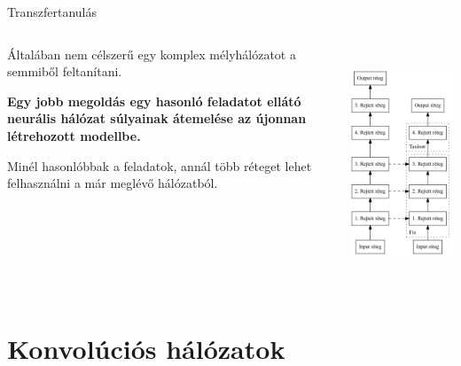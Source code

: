 \documentclass[english, aspectratio=169]{beamer}
\makeatletter
\let\origtableofcontents=\tableofcontents
\def\tableofcontents{\@ifnextchar[{\origtableofcontents}{\gobbletableofcontents}}
\def\gobbletableofcontents#1{\origtableofcontents}
\makeatother
\begin{document}
\begin{frame}{Transzfertanulás}
\begin{columns}
\begin{column}{.5\textwidth}
Általában nem célszerű egy komplex mélyhálózatot a semmiből feltanítani.\par\smallskip
\textbf{Egy jobb megoldás egy hasonló feladatot ellátó neurális hálózat súlyainak átemelése az újonnan létrehozott modellbe.}\par\smallskip
Minél hasonlóbbak a feladatok, annál több réteget lehet felhasználni a már meglévő hálózatból.
\end{column}
\begin{column}{.5\textwidth}
\begin{center}
\includegraphics[width=7cm, height=7cm, keepaspectratio]{graphs/neural_13.png}
\end{center}
\end{column}
\end{columns}
\end{frame}

\section{Konvolúciós hálózatok}

\begin{frame}
\tableofcontents[currentsection]
\end{frame}
\end{document}
